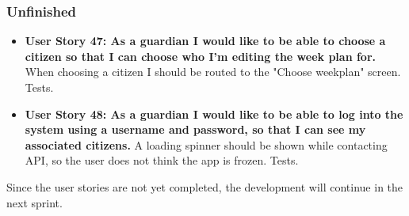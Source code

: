\subsubsection{Unfinished}
\begin{itemize}
    \item \textbf{User Story 47: As a guardian I would like to be able to choose a citizen so that I can choose who I’m editing the week plan for.}
    \subitem When  choosing  a  citizen  I  should  be  routed  to  the  "Choose  weekplan"  screen.
    \subitem Tests.
    
    \item \textbf{User Story 48: As a guardian I would like to be able to log into the system using a username and password, so that I can see my associated citizens.}
    \subitem A loading spinner should be shown while contacting API, so the user does not think the app is frozen.
    \subitem Tests.
\end{itemize}

Since the user stories are not yet completed, the development will continue in the next sprint. 